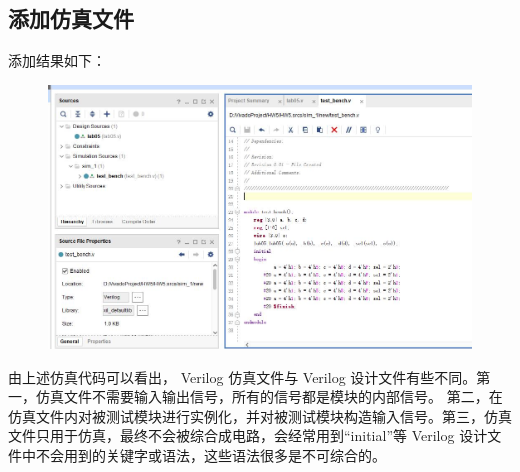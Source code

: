 \documentclass[UTF8]{article}
\begin{document}
	\subsection{添加仿真文件}
	添加结果如下：\par
	\begin{figure}[H]
		\centering
		\includegraphics[width=1\linewidth]{s4.jpg}
		\label{s4}
	\end{figure}
	由上述仿真代码可以看出， Verilog 仿真文件与 Verilog 设计文件有些不同。第一，仿真文件不需要输入输出信号，所有的信号都是模块的内部信号。 第二，在仿真文件内对被测试模块进行实例化，并对被测试模块构造输入信号。第三，仿真文件只用于仿真，最终不会被综合成电路，会经常用到“initial”等 Verilog 设计文件中不会用到的关键字或语法，这些语法很多是不可综合的。\par
	
	
\end{document}
